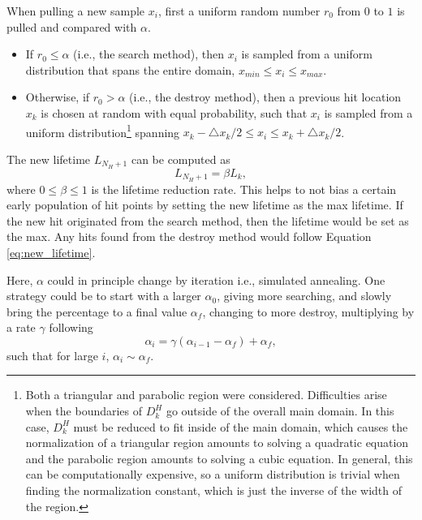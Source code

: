 \documentclass{article}
\begin{document}
When pulling a new sample $x_i$, first a uniform random number $r_0$ from $0$ to $1$ is pulled and compared with $\alpha$.
\begin{itemize}
	\item If $r_0 \le \alpha$ (i.e., the search method), then $x_i$ is sampled from a uniform distribution that spans the entire domain, $x_{min} \le x_i \le x_{max}$.
	\item Otherwise, if $r_0 > \alpha$ (i.e., the destroy method), then a previous hit location $x_k$ is chosen at random with equal probability, such that $x_i$ is sampled from a uniform distribution\footnote{Both a triangular and parabolic region were considered. Difficulties arise when the boundaries of $D_k^H$ go outside of the overall main domain. In this case, $D_k^H$ must be reduced to fit inside of the main domain, which causes the normalization of a triangular region amounts to solving a quadratic equation and the parabolic region amounts to solving a cubic equation. In general, this can be computationally expensive, so a uniform distribution is trivial when finding the normalization constant, which is just the inverse of the width of the region.} spanning $x_k - \triangle x_k/2 \le x_i \le x_k + \triangle x_k/2$.
\end{itemize}
 
The new lifetime $L_{N_H+1}$ can be computed as
\begin{equation}\label{eq:new_lifetime}
L_{N_H+1} = \beta L_k,  
\end{equation}
where $0 \le \beta \le 1$ is the lifetime reduction rate. This helps to not bias a certain early population of hit points by setting the new lifetime as the max lifetime. If the new hit originated from the search method, then the lifetime would be set as the max. Any hits found from the destroy method would follow Equation \eqref{eq:new_lifetime}.

Here, $\alpha$ could in principle change by iteration i.e., simulated annealing. One strategy could be to start with a larger $\alpha_0$, giving more searching, and slowly bring the percentage to a final value $\alpha_f$, changing to more destroy, multiplying by a rate $\gamma$ following
\begin{equation}
\alpha_i = \gamma(\alpha_{i-1}-\alpha_f) + \alpha_f,
\end{equation}
such that for large $i$, $\alpha_i \sim \alpha_f$.
\end{document}
